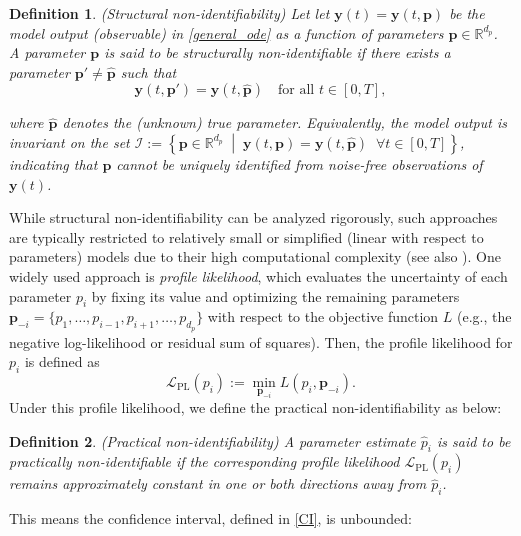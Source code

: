 \documentclass[letterpaper]{article} %
\theoremstyle{thmstyleone}%
\theoremstyle{thmstyletwo}%
\theoremstyle{thmstylethree}%
\newtheorem{definition}{Definition}%
\begin{document}
\begin{definition} (Structural non-identifiability)
Let let $\mathbf{y}(t)=\mathbf{y}(t,\mathbf{p})$ be the model output (observable) in \cref{general_ode} as a function of parameters $\mathbf{p}\in\mathbb{R}^{d_p}$. A parameter $\mathbf{p}$ is said to be \emph{structurally non-identifiable} if there exists a parameter $\mathbf{p}' \ne \hat{\mathbf{p}}$ such that $$\mathbf{y}(t, \mathbf{p}') = \mathbf{y}(t, \hat{\mathbf{p}}) \quad \text{for all } t \in [0, T],$$

where $\hat{\mathbf{p}}$ denotes the (unknown) true parameter. Equivalently, the model output is invariant on the set $\mathcal{I} := \left\{ \mathbf{p} \in \mathbb{R}^{d_p} \;\middle|\; \mathbf{y}(t, \mathbf{p}) = \mathbf{y}(t, \hat{\mathbf{p}}) \;\; \forall t \in [0,T] \right\}$, indicating that $\mathbf{p}$ cannot be uniquely identified from noise-free observations of $\mathbf{y}(t)$.

\end{definition}

While structural non-identifiability can be analyzed rigorously, such approaches are typically restricted to relatively small or simplified (linear with respect to parameters) models due to their high computational complexity (see also \cite{raue2009structural}). One widely used approach is \emph{profile likelihood}, which evaluates the uncertainty of each parameter $p_i$ by fixing its value and optimizing the remaining parameters $\mathbf{p}_{-i}=\{p_1, \dots, p_{i-1}, p_{i+1}, \dots, p_{d_p}\}$ with respect to the objective function $L$ (e.g., the negative log-likelihood or residual sum of squares). Then, the profile likelihood for $p_i$ is defined as
$$\mathcal{L}_{\text{PL}}(p_i) := \min_{\mathbf{p}_{-i}} L(p_i, \mathbf{p}_{-i}).$$
Under this profile likelihood, we define the practical non-identifiability as below: 

\begin{definition} (Practical non-identifiability) A parameter estimate $\hat{p}_i$ is said to be \emph{practically non-identifiable} if the corresponding profile likelihood $\mathcal{L}_{\text{PL}}(p_i)$ remains approximately constant in one or both directions away from $\hat{p}_i$.
\end{definition}
This means the confidence interval, defined in \cref{CI}, is unbounded:
\end{document}
